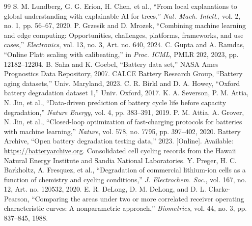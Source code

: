 \documentclass[preprint,12pt]{elsarticle}
\begin{document}
\begin{thebibliography}{99}
 S. M. Lundberg, G. G. Erion, H. Chen, et al., ``From local explanations to global understanding with explainable AI for trees,'' \emph{Nat. Mach. Intell.}, vol. 2, no. 1, pp. 56--67, 2020.
 P. Grzesik and D. Mrozek, ``Combining machine learning and edge computing: Opportunities, challenges, platforms, frameworks, and use cases,'' \emph{Electronics}, vol. 13, no. 3, Art. no. 640, 2024.
 C. Gupta and A. Ramdas, ``Online Platt scaling with calibeating,'' in \emph{Proc. ICML}, PMLR 202, 2023, pp. 12182--12204.
 B. Saha and K. Goebel, ``Battery data set,'' NASA Ames Prognostics Data Repository, 2007.
 CALCE Battery Research Group, ``Battery aging datasets,'' Univ. Maryland, 2023.
 C. R. Birkl and D. A. Howey, ``Oxford battery degradation dataset 1,'' Univ. Oxford, 2017.
 K. A. Severson, P. M. Attia, N. Jin, et al., ``Data-driven prediction of battery cycle life before capacity degradation,'' \emph{Nature Energy}, vol. 4, pp. 383--391, 2019.
 P. M. Attia, A. Grover, N. Jin, et al., ``Closed-loop optimization of fast-charging protocols for batteries with machine learning,'' \emph{Nature}, vol. 578, no. 7795, pp. 397--402, 2020.
 Battery Archive, ``Open battery degradation testing data,'' 2023. [Online]. Available: \url{https://batteryarchive.org}. Consolidated cell cycling records from the Hawaii Natural Energy Institute and Sandia National Laboratories.
 Y. Preger, H. C. Barkholtz, A. Fresquez, et al., ``Degradation of commercial lithium-ion cells as a function of chemistry and cycling conditions,'' \emph{J. Electrochem. Soc.}, vol. 167, no. 12, Art. no. 120532, 2020.
 E. R. DeLong, D. M. DeLong, and D. L. Clarke-Pearson, ``Comparing the areas under two or more correlated receiver operating characteristic curves: A nonparametric approach,'' \emph{Biometrics}, vol. 44, no. 3, pp. 837--845, 1988.
\end{thebibliography}
\end{document}
